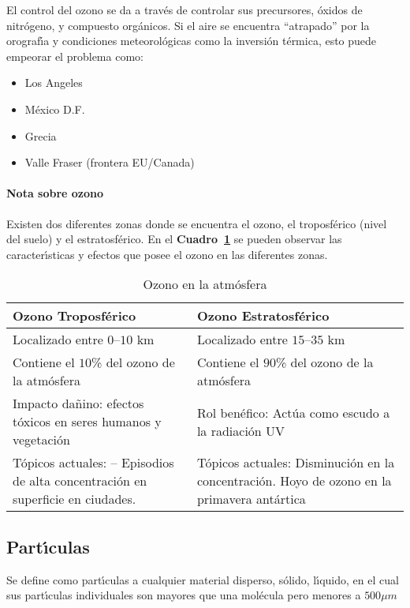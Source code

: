 El control del ozono se da a trav\'es de controlar sus precursores, \'oxidos de nitr\'ogeno, y compuesto org\'anicos. Si el aire se encuentra ``atrapado'' por la
orograf\'{\i}a y condiciones meteorol\'ogicas como la inversi\'on t\'ermica, esto puede empeorar el problema como:

\begin{itemize}
\item Los Angeles
\item M\'exico D.F.
\item Grecia
\item Valle Fraser (frontera EU/Canada)
\end{itemize}

\paragraph{Nota sobre ozono}
Existen dos diferentes zonas donde se encuentra el ozono, el troposf\'erico (nivel del
suelo) y el estratosf\'erico. En el \textbf{Cuadro~\ref{ozon:1}} se pueden observar las
caracter\'{\i}sticas y efectos que posee el ozono en las diferentes zonas.
\begin{table}[hbt]
\caption{Ozono en la atm\'osfera}
\label{ozon:1}
\begin{center}
{\footnotesize \begin{tabularx}{.8\textwidth}{X|X}
\textbf{Ozono Troposf\'erico}&\textbf{Ozono Estratosf\'erico}\\ \hline \hline
Localizado entre $0$--$10$ km& Localizado entre $15$--$35$ km\\
Contiene el $10$\% del ozono de la atm\'osfera&
Contiene el $90$\% del ozono de la atm\'osfera\\
Impacto da\~nino: efectos t\'oxicos en seres humanos y vegetaci\'on&
Rol ben\'efico: Act\'ua como escudo a la radiaci\'on UV\\
T\'opicos actuales: -- Episodios de alta concentraci\'on en superficie en ciudades.&
T\'opicos actuales: Disminuci\'on en la concentraci\'on. Hoyo de ozono en la
primavera ant\'artica\\\hline
\end{tabularx}}
\end{center}
\end{table}

\subsection{Part\'{\i}culas}
Se define como part\'{\i}culas a cualquier material disperso, s\'olido,
l\'{\i}quido, en el cual sus part\'{\i}culas individuales son mayores que una 
mo\-l\'e\-cu\-la pero menores a $500\mu m$


